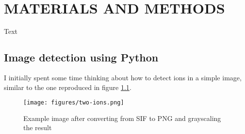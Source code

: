 \chapter[CHAPTER 2]{MATERIALS AND METHODS}\label{ch:2}
\vspace{-6mm} 
Text




\section{Image detection using Python}
\vspace{-8mm}
I initially spent some time thinking about how to detect ions in a simple image, similar to the one reproduced in figure \ref{fig:two}.

\begin{figure}[htb]
\centering   
\texttt{[image: figures/two-ions.png]}
\caption[Two Be ions in fluorescence image]{Example image after converting from SIF to PNG and grayscaling the result}
\label{fig:two}   
\end{figure}
\vspace{-5mm}





\vspace{-8mm}
